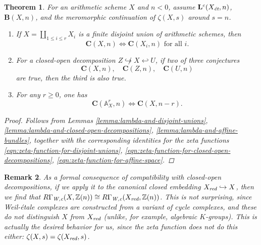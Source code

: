 \documentclass[10pt,a4paper,oneside,draft]{article}
\newcommand{\ZZ}{\mathbb{Z}}
\renewcommand{\AA}{\mathbb{A}}
\newcommand{\et}{\text{\it \'{e}t}}
\newcommand{\red}{\text{\it red}}
\newcommand{\Wc}{\text{\it W,c}}
\theoremstyle{myplain}
\newtheorem{theorem}{Theorem}[section]
\theoremstyle{mydefinition}
\newtheorem{remark}[theorem]{Remark}
\numberwithin{equation}{section}
\begin{document}
\begin{theorem}
  \label{thm:compatibility-of-C(X,n)}
  For an arithmetic scheme $X$ and $n < 0$, assume $\mathbf{L}^c (X_\et,n)$,
  $\mathbf{B} (X,n)$, and the meromorphic continuation of $\zeta (X,s)$ around
  $s = n$.

  \begin{enumerate}
  \item[1)] If $X = \coprod_{1 \le i \le r} X_i$ is a finite disjoint union of
    arithmetic schemes, then
    $$\mathbf{C} (X,n) \iff \mathbf{C} (X_i,n)\text{ for all }i.$$

  \item[2)] For a closed-open decomposition
    $Z \not\hookrightarrow X \hookleftarrow U$, if two of three conjectures
    \[ \mathbf{C} (X,n), \quad
      \mathbf{C} (Z,n), \quad
      \mathbf{C} (U,n) \]
    are true, then the third is also true.

  \item[3)] For any $r \ge 0$, one has
    $$\mathbf{C} (\AA^r_X, n) \iff \mathbf{C} (X, n-r).$$
  \end{enumerate}

  \begin{proof}
    Follows from Lemmas
    \ref{lemma:lambda-and-disjoint-unions},
    \ref{lemma:lambda-and-closed-open-decompositions},
    \ref{lemma:lambda-and-affine-bundles},
    together with the corresponding identities for the zeta functions
    \eqref{eqn:zeta-function-for-disjoint-unions},
    \eqref{eqn:zeta-function-for-closed-open-decompositions},
    \eqref{eqn:zeta-function-for-affine-space}.
  \end{proof}
\end{theorem}

\begin{remark}
  As a formal consequence of compatibility with closed-open decompositions, if
  we apply it to the canonical closed embedding $X_\red \hookrightarrow X$,
  then we find that
  $R\Gamma_\Wc (X, \ZZ(n)) \cong R\Gamma_\Wc (X_\red, \ZZ(n))$. This is not
  surprising, since Weil-\'{e}tale complexes are constructed from a variant of
  cycle complexes, and these do not distinguish $X$ from $X_\red$ (unlike, for
  example, algebraic $K$-groups). This is actually the desired behavior for us,
  since the zeta function does not do this either:
  $\zeta (X,s) = \zeta (X_\red,s)$.
\end{remark}
\end{document}
